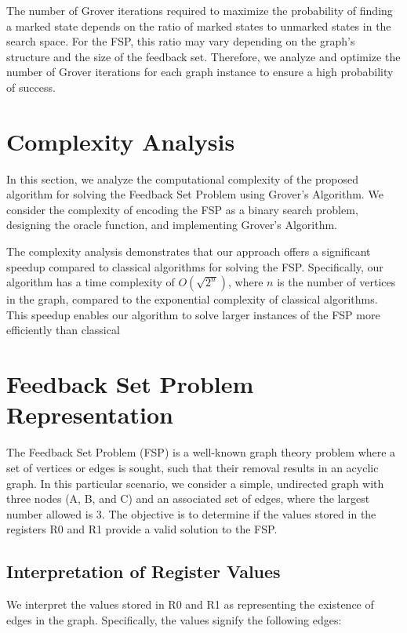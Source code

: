 The number of Grover iterations required to maximize the probability of finding a marked state depends on the ratio of marked states to unmarked states in the search space. For the FSP, this ratio may vary depending on the graph's structure and the size of the feedback set. Therefore, we analyze and optimize the number of Grover iterations for each graph instance to ensure a high probability of success.

\section{Complexity Analysis}
\label{sec:complexity_analysis}

In this section, we analyze the computational complexity of the proposed algorithm for solving the Feedback Set Problem using Grover's Algorithm. We consider the complexity of encoding the FSP as a binary search problem, designing the oracle function, and implementing Grover's Algorithm.

The complexity analysis demonstrates that our approach offers a significant speedup compared to classical algorithms for solving the FSP. Specifically, our algorithm has a time complexity of $O(\sqrt{2^n})$, where $n$ is the number of vertices in the graph, compared to the exponential complexity of classical algorithms. This speedup enables our algorithm to solve larger instances of the FSP more efficiently than classical

\section{Feedback Set Problem Representation}

The Feedback Set Problem (FSP) is a well-known graph theory problem where a set of vertices or edges is sought, such that their removal results in an acyclic graph. In this particular scenario, we consider a simple, undirected graph with three nodes (A, B, and C) and an associated set of edges, where the largest number allowed is 3. The objective is to determine if the values stored in the registers R0 and R1 provide a valid solution to the FSP.

\subsection{Interpretation of Register Values}

We interpret the values stored in R0 and R1 as representing the existence of edges in the graph. Specifically, the values signify the following edges:

